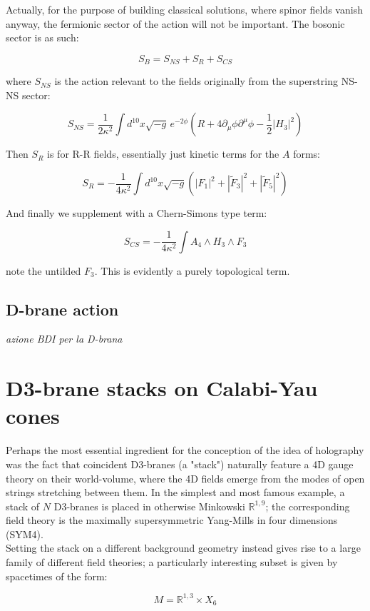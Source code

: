 \documentclass[11pt,a4paper,oneside,openright,titlepage]{book}
\newcommand{\cmmnt}[1]{\textcolor{Mahogany}{\emph{#1}}}
\begin{document}
Actually, for the purpose of building classical solutions, where spinor fields vanish anyway, the fermionic sector of the action will not be important. The bosonic sector is as such:

\[ S_B = S_{NS} + S_R + S_{CS} \]

where $S_{NS}$ is the action relevant to the fields originally from the superstring NS-NS sector:

\[ S_{NS} = \frac{1}{2\kappa^2} \int d^{10} x \sqrt{-g} \, e^{-2\phi} \left( R + 4 \partial_\mu \phi \partial^\mu \phi - \frac{1}{2} | H_3 |^2 \right) \]

Then $S_R$ is for R-R fields, essentially just kinetic terms for the $A$ forms:

\[ S_R = -\frac{1}{4\kappa^2} \int d^{10} x \sqrt{-g} 
\left(| F_1 |^2 + | \tilde{F}_3 |^2 + | \tilde{F}_5 |^2 \right)\]

And finally we supplement with a Chern-Simons type term:

\[ S_{CS} = -\frac{1}{4\kappa^2} \int A_4 \wedge H_3 \wedge F_3 \]

note the untilded $F_3$. This is evidently a purely topological term.

\section{D-brane action}

\cmmnt{azione BDI per la D-brana}

\chapter{D3-brane stacks on Calabi-Yau cones}

Perhaps the most essential ingredient for the conception of the idea of holography was the fact that coincident D3-branes (a "stack") naturally feature a 4D gauge theory on their world-volume, where the 4D fields emerge from the modes of open strings stretching between them. In the simplest and most famous example, a stack of $N$ D3-branes is placed in otherwise Minkowski $\mathbb{R}^{1,9}$; the corresponding field theory is the maximally supersymmetric Yang-Mills in four dimensions (SYM4).\\

Setting the stack on a different background geometry instead gives rise to a large family of different field theories; a particularly interesting subset is given by spacetimes of the form:

\begin{equation} M = \mathbb{R}^{1,3} \times X_6 \end{equation}
\end{document}
